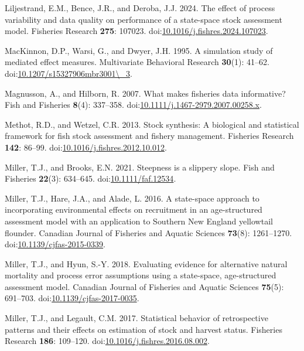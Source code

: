 \documentclass[
  12pt,
]{article}
\newlength{\cslhangindent}
\newenvironment{CSLReferences}[2] %
 {\begin{list}{}{%
  \setlength{\itemindent}{0pt}
  \setlength{\leftmargin}{0pt}
  \setlength{\parsep}{0pt}
  \ifodd #1
   \setlength{\leftmargin}{\cslhangindent}
   \setlength{\itemindent}{-1\cslhangindent}
  \fi
  \setlength{\itemsep}{#2\baselineskip}}}
 {\end{list}}
\begin{document}
\begin{CSLReferences}{1}{0}
Liljestrand, E.M., Bence, J.R., and Deroba, J.J. 2024. The effect of
process variability and data quality on performance of a state-space
stock assessment model. Fisheries Research \textbf{275}: 107023.
doi:\href{https://doi.org/10.1016/j.fishres.2024.107023}{10.1016/j.fishres.2024.107023}.

MacKinnon, D.P., Warsi, G., and Dwyer, J.H. 1995. A simulation study of
mediated effect measures. Multivariate Behavioral Research
\textbf{30}(1): 41--62.
doi:\href{https://doi.org/10.1207/s15327906mbr3001/_3}{10.1207/s15327906mbr3001\textbackslash\_3}.

Magnusson, A., and Hilborn, R. 2007. What makes fisheries data
informative? Fish and Fisheries \textbf{8}(4): 337--358.
doi:\href{https://doi.org/10.1111/j.1467-2979.2007.00258.x}{10.1111/j.1467-2979.2007.00258.x}.

Methot, R.D., and Wetzel, C.R. 2013. Stock synthesis: A biological and
statistical framework for fish stock assessment and fishery management.
Fisheries Research \textbf{142}: 86--99.
doi:\href{https://doi.org/10.1016/j.fishres.2012.10.012}{10.1016/j.fishres.2012.10.012}.

Miller, T.J., and Brooks, E.N. 2021. Steepness is a slippery slope. Fish
and Fisheries \textbf{22}(3): 634--645.
doi:\href{https://doi.org/10.1111/faf.12534}{10.1111/faf.12534}.

Miller, T.J., Hare, J.A., and Alade, L. 2016. A state-space approach to
incorporating environmental effects on recruitment in an age-structured
assessment model with an application to {S}outhern {N}ew {E}ngland
yellowtail flounder. Canadian Journal of Fisheries and Aquatic Sciences
\textbf{73}(8): 1261--1270.
doi:\href{https://doi.org/10.1139/cjfas-2015-0339}{10.1139/cjfas-2015-0339}.

Miller, T.J., and Hyun, S.-Y. 2018. Evaluating evidence for alternative
natural mortality and process error assumptions using a state-space,
age-structured assessment model. Canadian Journal of Fisheries and
Aquatic Sciences \textbf{75}(5): 691--703.
doi:\href{https://doi.org/10.1139/cjfas-2017-0035}{10.1139/cjfas-2017-0035}.

Miller, T.J., and Legault, C.M. 2017. Statistical behavior of
retrospective patterns and their effects on estimation of stock and
harvest status. Fisheries Research \textbf{186}: 109--120.
doi:\href{https://doi.org/10.1016/j.fishres.2016.08.002}{10.1016/j.fishres.2016.08.002}.


\end{CSLReferences}
\end{document}
